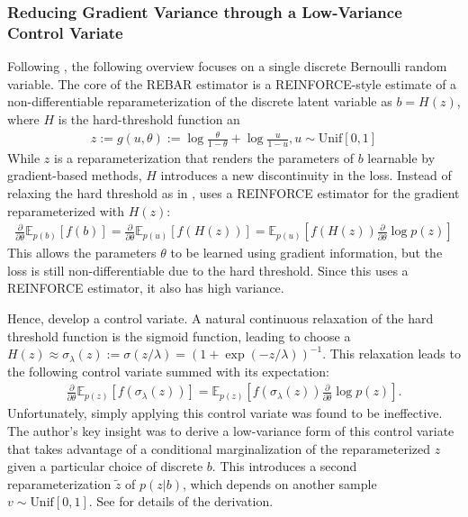 \documentclass{article}
\begin{document}
\subsubsection{Reducing Gradient Variance through a Low-Variance Control Variate}
Following \cite{tucker2017rebar}, the following overview focuses on a single discrete Bernoulli random variable.
The core of the REBAR estimator is a REINFORCE-style estimate of a non-differentiable reparameterization of the discrete latent variable as $b=H(z)$, where $H$ is the hard-threshold function an
\begin{align}
z := g(u, \theta) := \log\frac{\theta}{1-\theta} + \log\frac{u}{1-u}, u \sim \text{Unif}[0,1]
\end{align}
While $z$ is a reparameterization that renders the parameters of $b$ learnable by gradient-based methods, $H$ introduces a new discontinuity in the loss.
Instead of relaxing the hard threshold as in \cite{maddison2016concrete}, \cite{tucker2017rebar} uses a REINFORCE estimator for the gradient reparameterized with $H(z)$:
\begin{align}
    \frac{\partial}{\partial \theta} \mathbb{E}_{p(b)}[f(b)] = \frac{\partial}{\partial \theta} \mathbb{E}_{p(u)}[f(H(z))] = \mathbb{E}_{p(u)}[f(H(z))\frac{\partial}{\partial \theta}\log p(z)]
\end{align}
This allows the parameters $\theta$ to be learned using gradient information, but the loss is still non-differentiable due to the hard threshold.
Since this uses a REINFORCE estimator, it also has high variance.

Hence, \cite{tucker2017rebar} develop a control variate. A natural continuous relaxation of the hard threshold function is the sigmoid function, leading \cite{tucker2017rebar} to choose a $H(z) \approx \sigma_\lambda(z) := \sigma(z / \lambda) = (1+\exp( - z / \lambda))^{-1}$.
This relaxation leads to the following control variate summed with its expectation:
\begin{align}
    \frac{\partial}{\partial \theta} \mathbb{E}_{p(z)}[f(\sigma_\lambda(z))] =  \mathbb{E}_{p(z)}[f(\sigma_\lambda(z))\frac{\partial}{\partial \theta}\log p(z)].
\end{align}
Unfortunately, simply applying this control variate was found to be ineffective. 
The author's key insight was to derive a low-variance form of this control variate that takes advantage of a conditional marginalization of the reparameterized $z$ given a particular choice of discrete $b$.
This introduces a second reparameterization $\tilde{z}$ of $p(z|b)$, which depends on another sample $v\sim \text{Unif}[0,1]$.
See \cite{tucker2017rebar} for details of the derivation.
\end{document}
